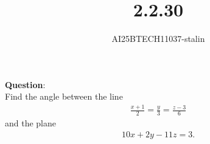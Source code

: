 \documentclass[journal]{IEEEtran}
\begin{document}

\vspace{3cm}

\title{2.2.30}
\author{AI25BTECH11037-stalin}
 \maketitle
{\let\newpage\relax\maketitle}
\renewcommand{\thefigure}{\theenumi}
\renewcommand{\thetable}{\theenumi}
\setlength{\intextsep}{10pt} %
\renewcommand{\thetable}{\theenumi}
\textbf{Question}:\\
 Find the angle between the line 
\begin{align}
\frac{x+1}{2} = \frac{y}{3} = \frac{z-3}{6}
\end{align}
and the plane 
\begin{align}
10x + 2y - 11z = 3.
\end{align}
\end{document}
